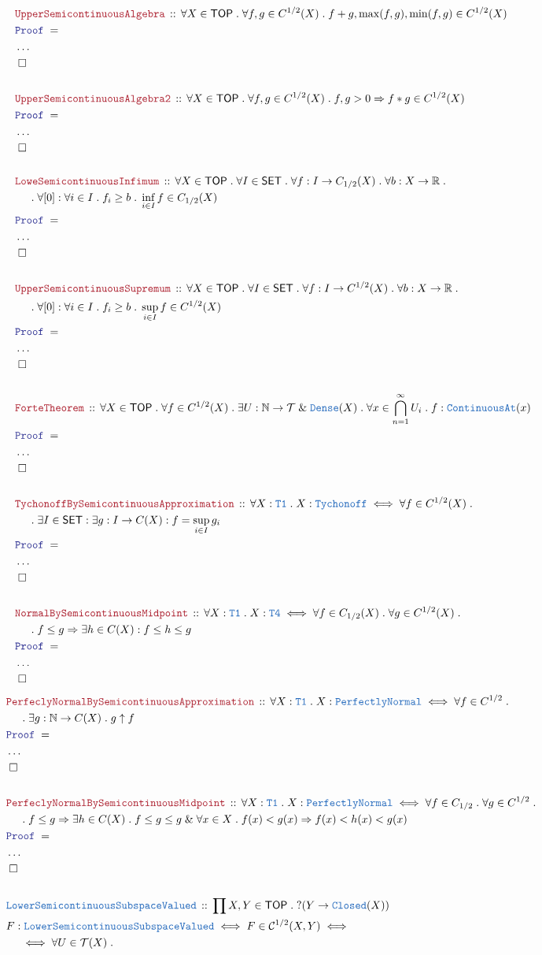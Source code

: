 \documentclass[12pt]{scrartcl}
\newcommand{\TYPE}[1]{\textcolor{NavyBlue}{\mathtt{#1}}}
\newcommand{\LOGIC}[1]{\textcolor{Blue}{\mathtt{#1}}}
\newcommand{\THM}[1]{\textcolor{Maroon}{\mathtt{#1}}}
\renewcommand{\.}{\; . \;}
\newcommand{\Theorem}[2]{& \THM{#1} \, :: \, #2 \\ & \Proof = \\ }
\newcommand{\DeclareType}[2]{& \TYPE{#1} \, :: \, #2 \\}
\newcommand{\DefineNamedType}[4]{& #1 : \TYPE{#2} \iff #3 \iff #4 \\}
\newcommand{\NewLine}{\\ & \kern 1pc}
\newcommand{\Page}[1]{ \begin{align*} #1 \end{align*}   }
\newcommand{\NoProof}{ & \ldots \\ \EndProof}
\renewcommand{\And}{\; \& \;}
\newcommand{\Imply}{\Rightarrow}
\newcommand{\Reals}{\mathbb{R} }
\newcommand{\Nat}{\mathbb{N} }
\newcommand{\QED}{\; \square}
\newcommand{\EndProof}{& \QED \\}
\newcommand{\Proof}{\LOGIC{Proof} \; }
\newcommand{\C}{\mathcal{C}}
\newcommand{\SET}{\mathsf{SET}}
\newcommand{\PN}{\TYPE{PerfectlyNormal}}
\newcommand{\TOP}{\mathsf{TOP}}
\newcommand{\T}{\mathcal{T}}
\begin{document}
\Page{
	\Theorem{UpperSemicontinuousAlgebra}
	{
		\forall X \in \TOP \.
		\forall f,g \in C^{1/2}(X) \.
		f + g, \max(f,g), \min(f,g) \in C^{1/2}(X)
	}
	\NoProof
	\\
	\Theorem{UpperSemicontinuousAlgebra2}
	{
		\forall X \in \TOP \.
		\forall f,g \in C^{1/2}(X) \. f,g > 0 \Imply
		f * g \in C^{1/2}(X)
	}
	\NoProof
	\\
	\Theorem{LoweSemicontinuousInfimum}
	{
		\forall X \in \TOP \. 
		\forall I \in \SET \.
		\forall f : I \to C_{1/2}(X) \.
		\forall b : X \to \Reals \. \NewLine \.  
		\forall [0] : \forall i \in I \. f_i \ge b \. 
		\inf_{i \in I} f \in C_{1/2}(X)
	}
	\NoProof
	\\
	\Theorem{UpperSemicontinuousSupremum}
	{
		\forall X \in \TOP \. 
		\forall I \in \SET \.
		\forall f : I \to C^{1/2}(X) \.
		\forall b : X \to \Reals \. \NewLine \.  
		\forall [0] : \forall i \in I \. f_i \ge b \. 
		\sup_{i \in I} f \in C^{1/2}(X)
	}
	\NoProof
	\\
	\Theorem{ForteTheorem}
	{
		\forall X \in \TOP \.
		\forall f \in C^{1/2}(X) \. 
		\exists U : \Nat \to \T \And \TYPE{Dense}(X) \.
		\forall x \in \bigcap^\infty_{n=1} U_i \.
		f : \TYPE{ContinuousAt}(x)
	}
	\NoProof
	\\
	\Theorem{TychonoffBySemicontinuousApproximation}
	{
		\forall X : \TYPE{T1} \.
		X : \TYPE{Tychonoff} \iff
		\forall f \in C^{1/2}(X) \. \NewLine \. 
		\exists I \in \SET :
		\exists g : I \to C(X) :
		f = \sup_{i \in I} g_i
	}
	\NoProof
	\\
	\Theorem{NormalBySemicontinuousMidpoint}
	{
		\forall X : \TYPE{T1} \.
		X : \TYPE{T4} \iff
		\forall f \in C_{1/2}(X) \.
		\forall g \in C^{1/2}(X) \. 
		\NewLine \.
		f \le g \Imply
		\exists h \in  C(X) :
		f \le h \le g 
	}
	\NoProof
}\Page{
	\Theorem{PerfeclyNormalBySemicontinuousApproximation}
	{
		\forall X : \TYPE{T1} \.
		X : \PN \iff
		\forall f \in C^{1/2} \. \NewLine \.
		\exists g : \Nat \to C(X) \. 
		g \uparrow f
	}
	\NoProof
	\\
	\Theorem{PerfeclyNormalBySemicontinuousMidpoint}
	{
		\forall X : \TYPE{T1} \.
		X : \PN \iff
		\forall f \in C_{1/2} \.
		\forall g \in C^{1/2} \. \NewLine \. 
		f \le g \Imply
		\exists h \in  C(X) \. 
		f \le g \le g \And 
		\forall x \in X \. f(x) < g(x) \Imply f(x) < h(x) < g(x) 
	}
	\NoProof
	\\
	\DeclareType{LowerSemicontinuousSubspaceValued}
	{
		\prod X,Y \in \TOP \.
		?( Y \to \TYPE{Closed}(X) )
	}
	\DefineNamedType{F}{LowerSemicontinuousSubspaceValued}{F \in \C^{1/2}(X,Y)}
	{
		\NewLine \iff
		\forall U \in \T(X) \.
}}
\end{document}
